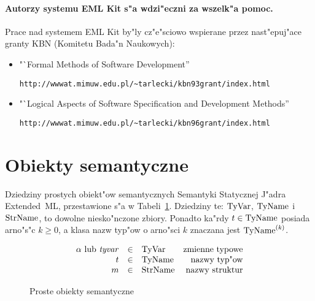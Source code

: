 \pagebreak

\paragraph{Autorzy systemu EML Kit s"a wdzi"eczni za wszelk"a pomoc.}
Prace nad systemem EML Kit by"ly cz"e"sciowo wspierane przez
nast"epuj"ace granty KBN (Komitetu Bada"n Naukowych):
\begin{itemize}
\item "`Formal Methods of Software Development''
\begin{verbatim}
http://wwwat.mimuw.edu.pl/~tarlecki/kbn93grant/index.html
\end{verbatim}
\item "`Logical Aspects of Software Specification and Development Methods''
\begin{verbatim}
http://wwwat.mimuw.edu.pl/~tarlecki/kbn96grant/index.html
\end{verbatim}
\end{itemize}

\section{Obiekty semantyczne}
\label{sec:semobjeml}

Dziedziny prostych obiekt"ow semantycznych Semantyki Statycznej J"adra Ex\-tend\-ed~ML,
przestawione s"a w Tabeli~\ref{simple-objects}.
Dziedziny te: ${\rm TyVar}$, ${\rm TyName}$ i ${\rm StrName}$, to dowolne niesko"nczone zbiory.
Ponadto ka"rdy $t\in{\rm TyName}$ posiada arno"s"c $k\geq 0$, 
a klasa nazw typ"ow o arno"sci $k$ znaczana jest ${\rm TyName}^{(k)}$.

\begin{figure}[h]
\begin{displaymath}
\begin{array}{rclr}
\alpha\index{\alpha@{$\alpha$ (zmienne typowe)}}\ {\rm lub}\ \tyvar
& \in   & \TyVar        & \mbox{zmienne typowe}\\
\t\index{t (type name)}               & \in   & \TyNames\index{TyName}  & \mbox{nazwy typ"ow}\\
\m\index{m (structure name)}            & \in   & \StrNames\index{StrName}      & \mbox{nazwy struktur}\\
\end{array}
\end{displaymath}
\caption{Proste obiekty semantyczne}
\label{simple-objects}
\end{figure}

